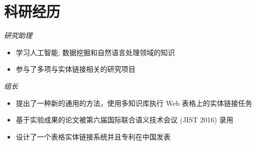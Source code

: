 \section{科研经历}
\textit{研究助理}
\begin{itemize}
  \item 学习人工智能, 数据挖掘和自然语言处理领域的知识
  \item 参与了多项与实体链接相关的研究项目
\end{itemize}

\textit{组长}
\begin{itemize}
  \item 提出了一种新的通用的方法，使用多知识库执行 Web 表格上的实体链接任务
  \item 基于实验成果的论文被第六届国际联合语义技术会议 (JIST 2016) 录用
  \item 设计了一个表格实体链接系统并且专利在中国发表
\end{itemize}